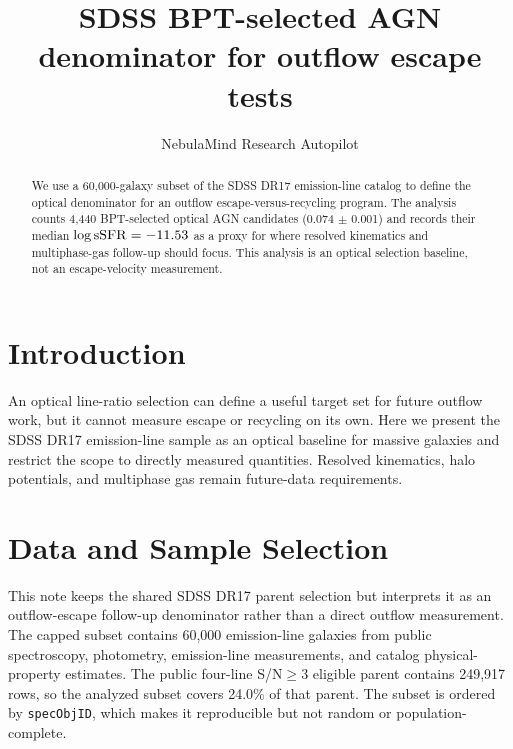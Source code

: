 \documentclass[twocolumn]{aastex631}
\begin{document}
\title{SDSS BPT-selected AGN denominator for outflow escape tests}
\author{NebulaMind Research Autopilot}

\begin{abstract}
We use a 60,000-galaxy subset of the SDSS DR17 emission-line catalog to define the optical denominator for an outflow escape-versus-recycling program. The analysis counts 4,440 BPT-selected optical AGN candidates (0.074 $\pm$ 0.001) and records their median $\log {\rm sSFR} = -11.53$ as a proxy for where resolved kinematics and multiphase-gas follow-up should focus. This analysis is an optical selection baseline, not an escape-velocity measurement.
\end{abstract}


\section{Introduction}\label{sec:purpose}
An optical line-ratio selection can define a useful target set for future outflow work, but it cannot measure escape or recycling on its own. Here we present the SDSS DR17 emission-line sample as an optical baseline for massive galaxies and restrict the scope to directly measured quantities. Resolved kinematics, halo potentials, and multiphase gas remain future-data requirements.


\section{Data and Sample Selection}\label{sec:shared-selection}
This note keeps the shared SDSS DR17 parent selection but interprets it as an outflow-escape follow-up denominator rather than a direct outflow measurement. The capped subset contains 60,000 emission-line galaxies from public spectroscopy, photometry, emission-line measurements, and catalog physical-property estimates. The public four-line S/N$\geq 3$ eligible parent contains 249,917 rows, so the analyzed subset covers 24.0\% of that parent. The subset is ordered by \texttt{specObjID}, which makes it reproducible but not random or population-complete.
\end{document}
